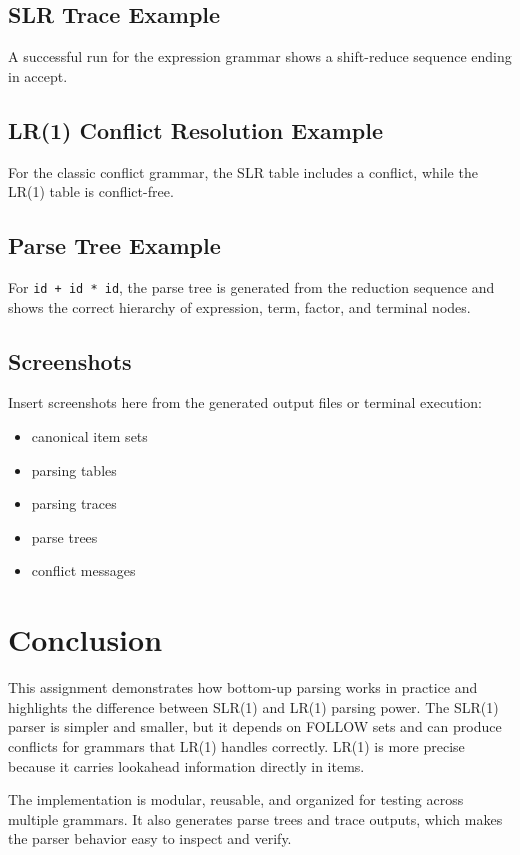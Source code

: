 \documentclass[12pt]{article}
\begin{document}
\subsection{SLR Trace Example}
A successful run for the expression grammar shows a shift-reduce sequence ending in accept.

\subsection{LR(1) Conflict Resolution Example}
For the classic conflict grammar, the SLR table includes a conflict, while the LR(1) table is conflict-free.

\subsection{Parse Tree Example}
For \texttt{id + id * id}, the parse tree is generated from the reduction sequence and shows the correct hierarchy of expression, term, factor, and terminal nodes.

\subsection{Screenshots}
Insert screenshots here from the generated output files or terminal execution:
\begin{itemize}[leftmargin=1.5em]
    \item canonical item sets
    \item parsing tables
    \item parsing traces
    \item parse trees
    \item conflict messages
\end{itemize}

\section{Conclusion}

This assignment demonstrates how bottom-up parsing works in practice and highlights the difference between SLR(1) and LR(1) parsing power. The SLR(1) parser is simpler and smaller, but it depends on FOLLOW sets and can produce conflicts for grammars that LR(1) handles correctly. LR(1) is more precise because it carries lookahead information directly in items.

The implementation is modular, reusable, and organized for testing across multiple grammars. It also generates parse trees and trace outputs, which makes the parser behavior easy to inspect and verify.
\end{document}
